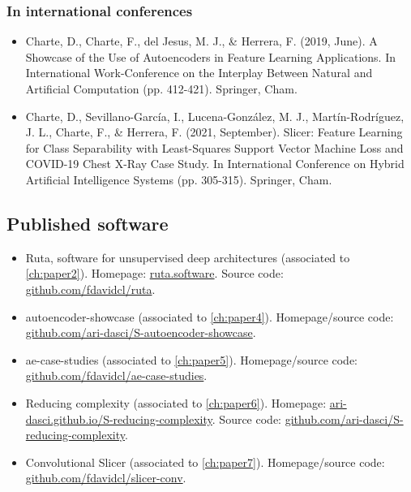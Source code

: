 \subsubsection{In international conferences}

\begin{itemize}
    \item Charte, D., Charte, F., del Jesus, M. J., \& Herrera, F. (2019, June). A Showcase of the Use of Autoencoders in Feature Learning Applications. In International Work-Conference on the Interplay Between Natural and Artificial Computation (pp. 412-421). Springer, Cham.
    \item Charte, D., Sevillano-García, I., Lucena-González, M. J., Martín-Rodríguez, J. L., Charte, F., \& Herrera, F. (2021, September). Slicer: Feature Learning for Class Separability with Least-Squares Support Vector Machine Loss and COVID-19 Chest X-Ray Case Study. In International Conference on Hybrid Artificial Intelligence Systems (pp. 305-315). Springer, Cham.
\end{itemize}

\subsection{Published software}

\begin{itemize}
    \item Ruta, software for unsupervised deep architectures (associated to \autoref{ch:paper2}). Homepage: \href{https://ruta.software/}{ruta.software}. Source code: \href{https://github.com/fdavidcl/ruta}{github.com/fdavidcl/ruta}.
    \item autoencoder-showcase (associated to \autoref{ch:paper4}). Homepage/source code: \href{https://github.com/ari-dasci/S-autoencoder-showcase}{github.com/ari-dasci/S-autoencoder-showcase}.
    \item ae-case-studies (associated to \autoref{ch:paper5}). Homepage/source code: \href{https://github.com/fdavidcl/ae-case-studies}{github.com/fdavidcl/ae-case-studies}.
    \item Reducing complexity (associated to \autoref{ch:paper6}). Homepage: \href{https://ari-dasci.github.io/S-reducing-complexity/}{ari-dasci.github.io/S-reducing-complexity}. Source code: \href{https://github.com/ari-dasci/S-reducing-complexity}{github.com/ari-dasci/S-reducing-complexity}.
    \item Convolutional Slicer (associated to \autoref{ch:paper7}). Homepage/source code: \href{https://github.com/fdavidcl/slicer-conv}{github.com/fdavidcl/slicer-conv}.
\end{itemize}

